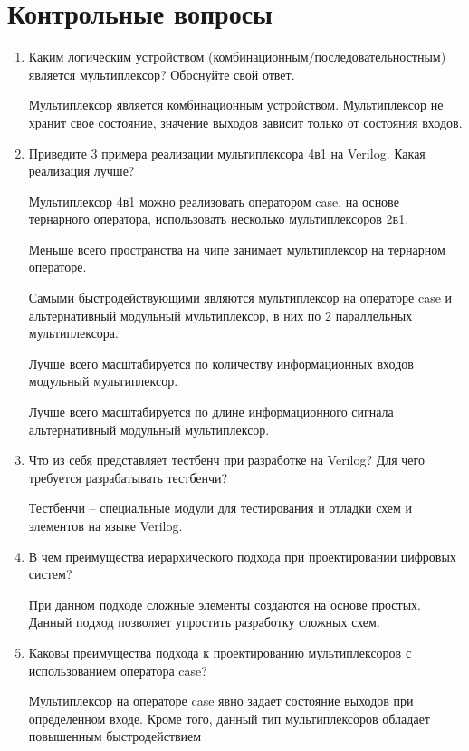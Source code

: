 \documentclass[a4paper,14pt]{article}
\begin{document}
\section{Контрольные вопросы}

\begin{enumerate}
	\item Каким логическим устройством (комбинационным/последовательностным) является	мультиплексор? Обоснуйте свой ответ.
	
	Мультиплексор является комбинационным устройством.
	Мультиплексор не хранит свое состояние, значение выходов зависит только от состояния входов.
	
	\item Приведите 3 примера реализации мультиплексора 4в1 на Verilog. Какая реализация лучше?

	Мультиплексор 4в1 можно реализовать оператором case, на основе тернарного оператора, использовать несколько мультиплексоров 2в1.
	
	Меньше всего пространства на чипе занимает мультиплексор на тернарном операторе.
	
	Самыми быстродействующими являются мультиплексор на операторе case и альтернативный модульный мультиплексор, в них по 2 параллельных мультиплексора.
	
	Лучше всего масштабируется по количеству информационных входов модульный мультиплексор.
	
	Лучше всего масштабируется по длине информационного сигнала альтернативный модульный мультиплексор.
	
	\item Что из себя представляет тестбенч при разработке на Verilog? Для чего требуется	разрабатывать тестбенчи?
	
	Тестбенчи -- специальные модули для тестирования и отладки схем и элементов на языке Verilog.
	
	\item В чем преимущества иерархического подхода при проектировании цифровых систем?
	
	При данном подходе сложные элементы создаются на основе простых.
	Данный подход позволяет упростить разработку сложных схем.
	
	\item Каковы преимущества подхода к проектированию мультиплексоров с использованием оператора case?
	
	Мультиплексор на операторе case явно задает состояние выходов при определенном входе.
	Кроме того, данный тип мультиплексоров обладает повышенным быстродействием
	

\end{enumerate}
\end{document}
